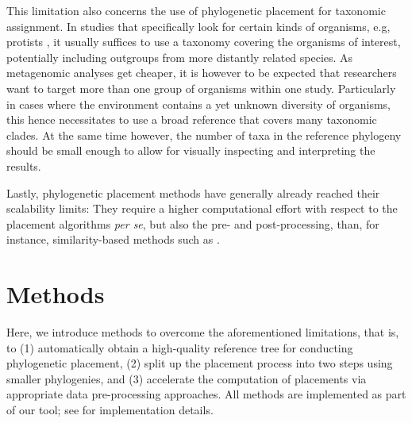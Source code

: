 This limitation also concerns the use of phylogenetic placement for taxonomic assignment.
In studies that specifically look for certain kinds of organisms, e.g, protists \citep{Mahe2017},
it usually suffices to use a taxonomy covering the organisms of interest,
potentially including outgroups from more distantly related species.
As metagenomic analyses get cheaper,
it is however to be expected that researchers want to target more than one group of organisms within one study.
Particularly in cases where the environment contains a yet unknown diversity of organisms,
this hence necessitates to use a broad reference that covers many taxonomic clades.
At the same time however, the number of taxa in the reference phylogeny
should be small enough to allow for visually inspecting and interpreting the results.

Lastly, phylogenetic placement methods have generally already reached their scalability limits:
They require a higher computational effort with respect to the placement algorithms \emph{per se},
but also the pre- and post-processing, than, for instance, similarity-based methods such as .



\section{Methods}
\label{ch:AutomaticTrees:sec:Methods}


Here, we introduce methods to overcome the aforementioned limitations, that is, to
(1) automatically obtain a high-quality reference tree for conducting phylogenetic placement,
(2) split up the placement process into two steps using smaller phylogenies,
and (3) accelerate the computation of placements via appropriate data pre-processing approaches.
All methods are implemented as part of our  tool;
see  for implementation details.

